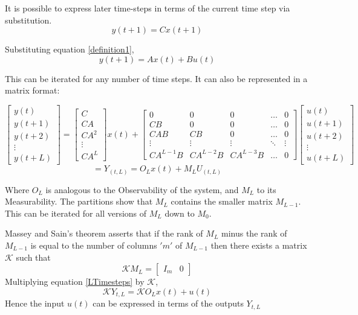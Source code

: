 \documentclass{report}
\begin{document}
It is possible to express later time-steps in terms of the current time step via substitution.
\[					%
	y(t+1)=Cx(t+1)
\]

Substituting equation \ref{definition1},
\[
	y(t+1)= Ax(t)+Bu(t)
\]

This can be iterated for any number of time steps. It can also be represented in a matrix format:

\[
	\begin{bmatrix}
		y(t)   \\
		y(t+1) \\
		y(t+2) \\
		\vdots \\
		y(t+L)
	\end{bmatrix}
	=
	\begin{bmatrix}
		C   \\
		CA  \\
		CA^2\\
		\vdots\\
		CA^L
	\end{bmatrix}
	x(t) +
	\left[
	\begin{array}{c|cccc}			%
	0&0&0&\hdots&0						\\
	CB&0&0&\hdots&0						\\
	CAB&CB&0&\hdots&0					\\
	\vdots&\vdots&\vdots&\ddots&\vdots	\\
	CA^{L-1}B & CA^{L-2}B & CA^{L-3}B & \hdots & 0
	\end{array}
	\right]
	\left[
	\begin{array}{c}
		u(t)		\\
		\hline
		u(t+1)		\\
		u(t+2)		\\
		\vdots		\\
		u(t+L)
	\end{array}
	\right]
\]
\begin{equation}
\label{LTimesteps}
=Y_{(t,L)} = O_Lx(t)+M_L U_{(t,L)}
\end{equation}

Where $O_L$ is analogous to the Observability of the system, and $M_L$ to its Measurability. The partitions show that $M_L$ contains the smaller matrix $M_{L-1}$. This can be iterated for all versions of $M_L$ down to $M_0$.

Massey and Sain's theorem\cite{OGMassaySain} asserts that if the rank of $M_L$ minus the rank of $M_{L-1}$ is equal to the number of columns $'m'$ of $M_{L-1}$ then there exists a matrix $\mathcal{K}$ such that
\[
\mathcal{K}M_L =
\left[
\begin{array}{c|c}
I_m & 0
\end{array}
\right]
\]
Multiplying equation \ref{LTimesteps} by $\mathcal{K}$,
\[
\mathcal{K}Y_{t,L} = \mathcal{K}O_Lx(t) + u(t)
\]
Hence the input $u(t)$ can be expressed in terms of the outputs $Y_{t,L}$
\end{document}
